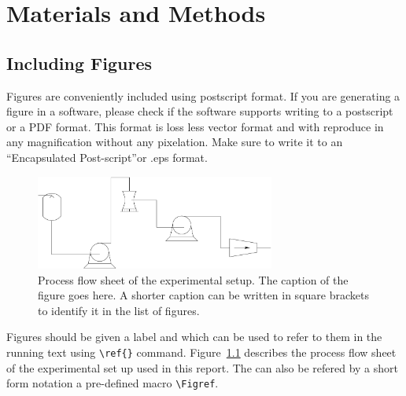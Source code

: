 \chapter{Materials and Methods}

\section{Including Figures}

Figures are conveniently included using postscript  format.  If you are
generating a figure in a software, please check if the software
supports writing to a postscript or a PDF format. This format is loss
less vector format and with reproduce in any magnification without any
pixelation. Make sure to write it to an ``Encapsulated Post-script''or
.eps format.


\begin{figure}[tbp]
  \centering
    \includegraphics[width=0.7\textwidth]{profflow}
    \caption[Process flow sheet]{Process flow sheet of the
      experimental setup. The caption of the figure goes here. A
      shorter caption can be written in square brackets to identify it
      in the list of figures.}
    \label{fig:pfs} 
\end{figure}

Figures should be given a label and which can be used to refer to them
in the running text using \verb|\ref{}| command. Figure~\ref{fig:pfs}
describes the process flow sheet of the experimental set up used in
this report. The  can also be refered by a short form notation
a pre-defined macro \verb"\Figref".



